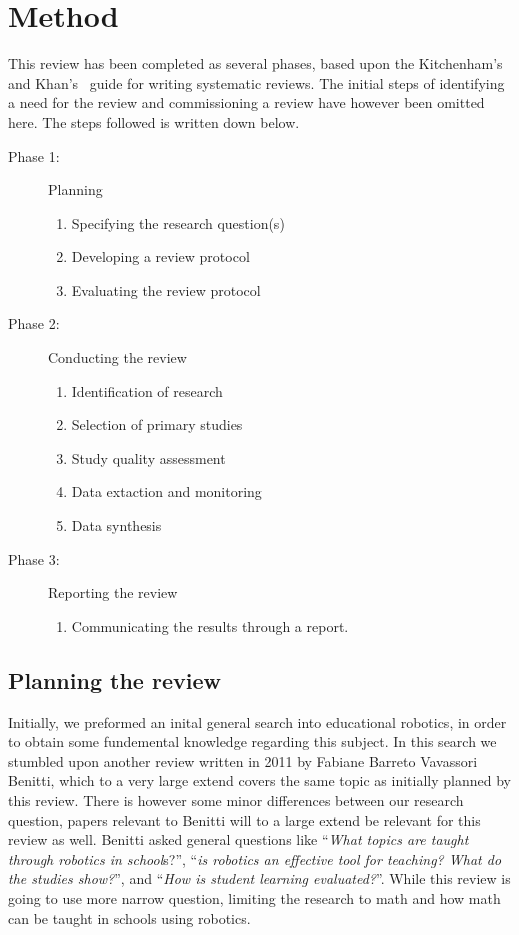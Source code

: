 \section*{Method}
This review has been completed as several phases, based upon the Kitchenham's \cite{kitchenham2007guidelines} and Khan's~\cite{khan2001undertaking} guide for writing systematic reviews. The initial steps of identifying a need for the review and commissioning a review have however been omitted here. The steps followed is written down below.
\begin{description}
	\item[Phase 1: ] Planning
		\begin{enumerate}
			\item Specifying the research question(s)
			\item Developing a review protocol
			\item Evaluating the review protocol
		\end{enumerate}
	\item[Phase 2: ] Conducting the review
		\begin{enumerate}
			\item Identification of research
			\item Selection of primary studies
			\item Study quality assessment
			\item Data extaction and monitoring
			\item Data synthesis
		\end{enumerate}
	\item[Phase 3: ] Reporting the review
		\begin{enumerate}
			\item Communicating the results through a report.
		\end{enumerate}
\end{description}

\subsection*{Planning the review}
\label{sec:questions}
Initially, we preformed an inital general search into educational robotics, in order to obtain some fundemental knowledge regarding this subject. In this search we stumbled upon another review written in 2011 by Fabiane Barreto Vavassori Benitti\cite{Benitti2012978}, which to a very large extend covers the same topic as initially planned by this review. There is however some minor differences between our research question, papers relevant to Benitti will to a large extend be relevant for this review as well. Benitti asked general questions like "`\textit{What topics are taught through robotics in school}s?"', "`\textit{is robotics an effective tool for teaching? What do the studies show?}"', and "`\textit{How is student learning evaluated?}"'. While this review is going to use more narrow question, limiting the research to math and how math can be taught in schools using robotics.
 
